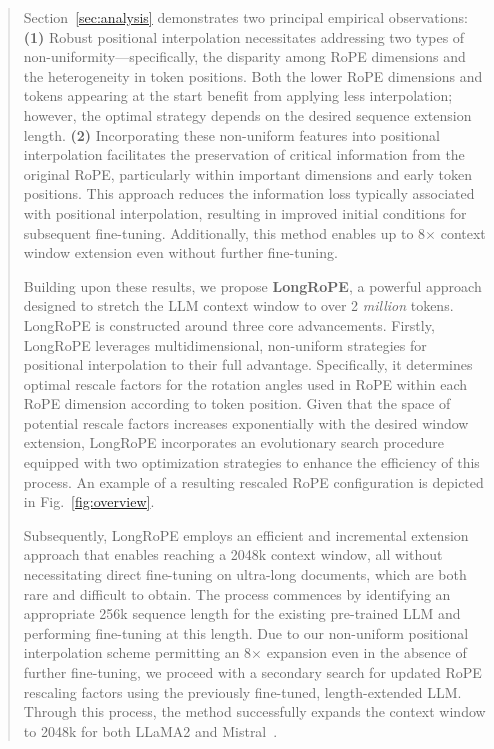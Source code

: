 \begin{abstract}
Section~\ref{sec:analysis} demonstrates two principal empirical observations: \textbf{(1)} Robust positional interpolation necessitates addressing two types of non-uniformity—specifically, the disparity among RoPE dimensions and the heterogeneity in token positions. Both the lower RoPE dimensions and tokens appearing at the start benefit from applying less interpolation; however, the optimal strategy depends on the desired sequence extension length. 
\textbf{(2)} Incorporating these non-uniform features into positional interpolation facilitates the preservation of critical information from the original RoPE, particularly within important dimensions and early token positions. This approach reduces the information loss typically associated with positional interpolation, resulting in improved initial conditions for subsequent fine-tuning. Additionally, this method enables up to 8$\times$ context window extension even without further fine-tuning.

Building upon these results, we propose \textbf{LongRoPE}, a powerful approach designed to stretch the LLM context window to over 2 \emph{million} tokens. LongRoPE is constructed around three core advancements. Firstly, {LongRoPE} leverages multidimensional, non-uniform strategies for positional interpolation to their full advantage. Specifically, it determines optimal rescale factors for the rotation angles used in RoPE within each RoPE dimension according to token position. Given that the space of potential rescale factors increases exponentially with the desired window extension, {LongRoPE} incorporates an evolutionary search procedure equipped with two optimization strategies to enhance the efficiency of this process. An example of a resulting rescaled RoPE configuration is depicted in Fig.~\ref{fig:overview}.

Subsequently, {LongRoPE} employs an efficient and incremental extension approach that enables reaching a 2048k context window, all without necessitating direct fine-tuning on ultra-long documents, which are both rare and difficult to obtain. The process commences by identifying an appropriate 256k sequence length for the existing pre-trained LLM and performing fine-tuning at this length. Due to our non-uniform positional interpolation scheme permitting an 8$\times$ expansion even in the absence of further fine-tuning, we proceed with a secondary search for updated RoPE rescaling factors using the previously fine-tuned, length-extended LLM. Through this process, the method successfully expands the context window to 2048k for both LLaMA2 and Mistral~\cite{mistral}.


\end{abstract}
